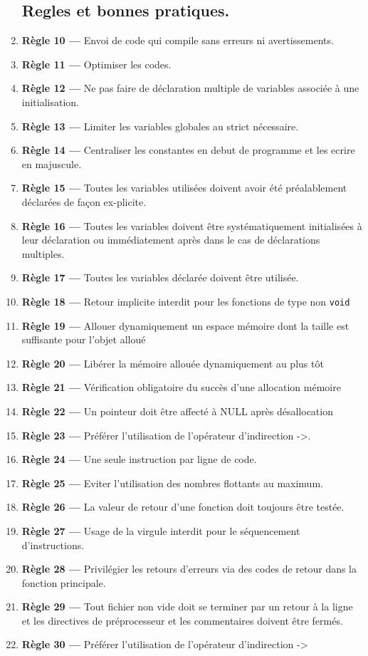\documentclass{article}
\begin{document}
\begin{enumerate}
\subsection{Regles et bonnes pratiques.}  
    \item \textbf{Règle 10 —} Envoi de code qui compile sans erreurs ni avertissements.
    \item \textbf{Règle 11 —} Optimiser les codes.
    \item \textbf{Règle 12 —} Ne pas faire de déclaration multiple de variables associée à une initialisation.
    \item \textbf{Règle 13 —} Limiter les variables globales au strict nécessaire.
    \item \textbf{Règle 14 —} Centraliser les constantes en debut de programme et les ecrire en majuscule.
     \item \textbf{Règle 15 —} Toutes les variables utilisées doivent avoir été préalablement déclarées de façon ex-plicite.
     \item \textbf{Règle 16 —} Toutes les variables doivent être systématiquement initialisées à leur déclaration ou
immédiatement après dans le cas de déclarations multiples.
	 \item \textbf{Règle 17 —} Toutes les variables déclarée doivent être utilisée.
    \item \textbf{Règle 18 —} Retour implicite interdit pour les fonctions de type non \texttt{void}
    \item \textbf{Règle 19 —} Allouer dynamiquement un espace mémoire dont la taille est suffisante pour l’objet alloué
    \item \textbf{Règle 20 —} Libérer la mémoire allouée dynamiquement au plus tôt
    \item \textbf{Règle 21 —} Vérification obligatoire du succès d’une allocation mémoire
    \item \textbf{Règle 22 —} Un pointeur doit être affecté à NULL après désallocation

	\item \textbf{Règle 23 —} Préférer l'utilisation de l'opérateur d'indirection ->.
	\item \textbf{Règle 24 —} Une seule instruction par ligne de code.
	\item \textbf{Règle 25 —} Eviter l'utilisation des nombres flottants au maximum.
	\item \textbf{Règle 26 —} La valeur de retour d'une fonction doit toujours être testée.
	\item \textbf{Règle 27 —} Usage de la virgule interdit pour le séquencement d'instructions.
	\item \textbf{Règle 28 —} Privilégier les retours d'erreurs via des codes de
retour dans la fonction principale.
	\item \textbf{Règle 29 —} Tout fichier non vide doit se terminer par un retour à la ligne et
les directives de préprocesseur et les commentaires doivent être fermés.
	\item \textbf{Règle 30 —} Préférer l'utilisation de l'opérateur d'indirection ->


 
\end{enumerate}
\end{document}
